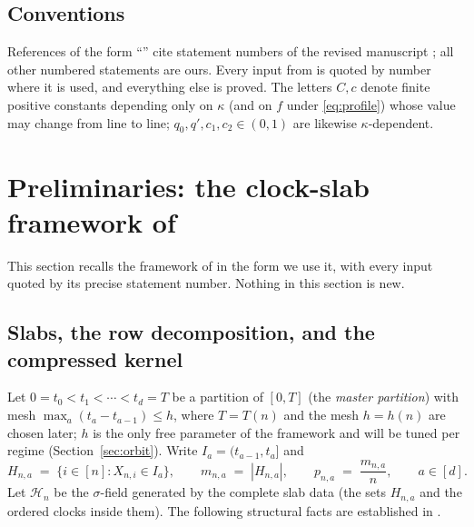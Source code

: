 \documentclass[11pt]{article}
\newcommand{\1}{\mathbf{1}}
\newcommand{\cH}{\mathcal{H}}
\theoremstyle{remark}
\begin{document}
\subsection{Conventions}
References of the form ``\cite[Lemma~6.9]{Lon26}'' cite statement
numbers of the revised manuscript \cite{Lon26}; all other numbered
statements are ours. Every input from \cite{Lon26} is quoted by number
where it is used, and everything else is proved. The letters $C,c$
denote finite positive constants depending only on $\kappa$ (and on
$f$ under \eqref{eq:profile}) whose value may change from line to
line; $q_0,q',c_1,c_2\in(0,1)$ are likewise $\kappa$-dependent.


\section{Preliminaries: the clock-slab framework of \cite{Lon26}}\label{sec:prelim}

This section recalls the framework of \cite[Section~6]{Lon26} in the form we
use it, with every input quoted by its precise statement number. Nothing in
this section is new.

\subsection{Slabs, the row decomposition, and the compressed kernel}
Let $0=t_0<t_1<\cdots<t_d=T$ be a partition of $[0,T]$ (the \emph{master
partition}) with mesh $\max_a(t_a-t_{a-1})\le h$, where $T=T(n)$ and the mesh
$h=h(n)$ are chosen later; $h$ is the only free parameter of the framework
and will be tuned per regime (Section~\ref{sec:orbit}). Write
$I_a=(t_{a-1},t_a]$ and
\[
H_{n,a}\;=\;\{i\in[n]:X_{n,i}\in I_a\},\qquad m_{n,a}\;=\;|H_{n,a}|,\qquad
p_{n,a}\;=\;\frac{m_{n,a}}{n},\qquad a\in[d].
\]
Let $\cH_n$ be the $\sigma$-field generated by the complete slab data (the
sets $H_{n,a}$ and the ordered clocks inside them). The following structural
facts are established in \cite[Section~6.2]{Lon26}.
\end{document}
